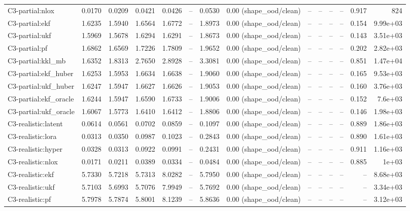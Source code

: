 \begin{table}[t]
\begin{tabular}{lrrrrrrrrrrrrr}
C3-partial:nlox & 0.0170 & 0.0209 & 0.0421 & 0.0426 & – & 0.0530 & 0.00 (shape\_ood/clean) & – & – & – & – & 0.917 & 824 \\
C3-partial:ekf & 1.6235 & 1.5940 & 1.6564 & 1.6772 & – & 1.8973 & 0.00 (shape\_ood/clean) & – & – & – & – & 0.154 & 9.99e+03 \\
C3-partial:ukf & 1.5969 & 1.5678 & 1.6294 & 1.6291 & – & 1.8673 & 0.00 (shape\_ood/clean) & – & – & – & – & 0.143 & 3.51e+03 \\
C3-partial:pf & 1.6862 & 1.6569 & 1.7226 & 1.7809 & – & 1.9652 & 0.00 (shape\_ood/clean) & – & – & – & – & 0.202 & 2.82e+03 \\
C3-partial:kkl\_mb & 1.6352 & 1.8313 & 2.7650 & 2.8928 & – & 3.3081 & 0.00 (shape\_ood/clean) & – & – & – & – & 0.851 & 1.47e+04 \\
C3-partial:ekf\_huber & 1.6253 & 1.5953 & 1.6634 & 1.6638 & – & 1.9060 & 0.00 (shape\_ood/clean) & – & – & – & – & 0.165 & 9.53e+03 \\
C3-partial:ukf\_huber & 1.6247 & 1.5947 & 1.6627 & 1.6626 & – & 1.9053 & 0.00 (shape\_ood/clean) & – & – & – & – & 0.160 & 3.76e+03 \\
C3-partial:ekf\_oracle & 1.6244 & 1.5947 & 1.6590 & 1.6733 & – & 1.9006 & 0.00 (shape\_ood/clean) & – & – & – & – & 0.152 & 7.6e+03 \\
C3-partial:ukf\_oracle & 1.6067 & 1.5773 & 1.6410 & 1.6412 & – & 1.8806 & 0.00 (shape\_ood/clean) & – & – & – & – & 0.146 & 1.98e+03 \\
C3-realistic:latent & 0.0614 & 0.0561 & 0.0702 & 0.0859 & – & 0.1097 & 0.00 (shape\_ood/clean) & – & – & – & – & 0.889 & 1.86e+03 \\
C3-realistic:lora & 0.0313 & 0.0350 & 0.0987 & 0.1023 & – & 0.2843 & 0.00 (shape\_ood/clean) & – & – & – & – & 0.890 & 1.61e+03 \\
C3-realistic:hyper & 0.0328 & 0.0313 & 0.0922 & 0.0991 & – & 0.2431 & 0.00 (shape\_ood/clean) & – & – & – & – & 0.911 & 1.16e+03 \\
C3-realistic:nlox & 0.0171 & 0.0211 & 0.0389 & 0.0334 & – & 0.0484 & 0.00 (shape\_ood/clean) & – & – & – & – & 0.885 & 1e+03 \\
C3-realistic:ekf & 5.7330 & 5.7218 & 5.7313 & 8.0282 & – & 5.7950 & 0.00 (shape\_ood/clean) & – & – & – & – & – & 8.68e+03 \\
C3-realistic:ukf & 5.7103 & 5.6993 & 5.7076 & 7.9949 & – & 5.7692 & 0.00 (shape\_ood/clean) & – & – & – & – & – & 3.34e+03 \\
C3-realistic:pf & 5.7978 & 5.7874 & 5.8001 & 8.1239 & – & 5.8636 & 0.00 (shape\_ood/clean) & – & – & – & – & – & 3.12e+03 \\

\end{tabular}
\end{table}
